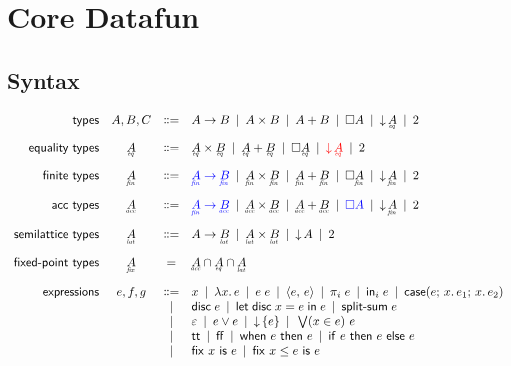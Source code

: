 \documentclass{article}
\begin{document}
\section{Core Datafun}


\subsection{Syntax}

\[
\begin{array}{rccl}
  \textsf{types} & A,B,C
  &\bnfeq& A \to B \pipe A \x B \pipe A + B
  \pipe \Disc{A} \pipe \Down{\eq{A}} \pipe \tbool
  \vspace{1em}\\

  \textsf{equality types} & \eq{A}
  &\bnfeq& \eq{A} \x \eq{B} \pipe \eq{A} + \eq{B}
  \pipe \Disc{\eq{A}} \pipe {\color{red} \Down{\eq{A}}} \pipe \tbool
  \vspace{1em}\\

  \textsf{finite types} & \fin{A}
  &\bnfeq& {\color{blue} \fin{A} \to \fin{B}}
  \pipe \fin{A} \x \fin{B} \pipe \fin{A} + \fin{B}
  \pipe \Disc{\fin{A}} \pipe \Down{\fin{A}} \pipe \tbool
  \vspace{1em}\\

  \textsf{acc types} & \acc{A}
  &\bnfeq& {\color{blue} \fin{A} \to \acc{B}}
  \pipe \acc{A} \x \acc{B} \pipe \acc{A} + \acc{B}
  \pipe {\color{blue} \Disc{A}} \pipe \Down{\fin{A}} \pipe \tbool
  \vspace{1em}\\

  \textsf{semilattice types} & \lat{A}
  &\bnfeq& A \to \lat{B} \pipe \lat{A} \x \lat{B} \pipe \Down{A} \pipe \tbool
  \vspace{1em}\\

  \textsf{fixed-point types} & \under{fix}{A}
  &=& \acc{A} \cap \eq{A} \cap \lat{A}
  \vspace{1em}\\

  \textsf{expressions} & e,f,g
  &\bnfeq& x \pipe \fn\bind{x} e \pipe e\; e
  \pipe \pair{e}{e} \pipe \pi_i\; e
  \pipe \inj{i}{e} \pipe \case{e}{x}{e_1}{x}{e_2} \\
  &&\pipe& \disc{e} \pipe \letdisc{x}{e}{e} \pipe \splitsum{e}\\
  &&\pipe& \unit \pipe e \vee e \pipe \downintro{e} \pipe \downelim{x}{e}{e}\\
  &&\pipe& \ett \pipe \eff \pipe \when{e}{e} \pipe \ifthen{e}{e}{e}\\
  &&\pipe& \fix{x}{e} \pipe \fixle{x}{e}{e}
\end{array}
\]
\end{document}

